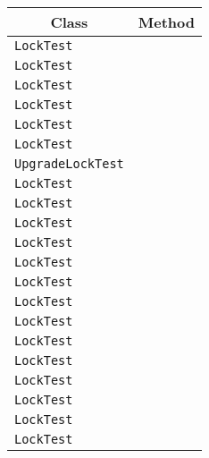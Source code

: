 \begin{center}
\begin{tabular}{ll}\toprule
\multicolumn{1}{c}{Class}&\multicolumn{1}{c}{Method}\\\midrule
\lstinline/LockTest/&\raisebox{0pt}{\lstinline/ testContendedPessimisticWriteLockNoWait()/}\\ 
\lstinline/LockTest/&\raisebox{0pt}{\lstinline/ testContendedPessimisticWriteLockTimeout()/}\\ 
\lstinline/LockTest/&\raisebox{0pt}{\lstinline/ testQueryTimeoutEMProps()/}\\ 
\lstinline/LockTest/&\raisebox{0pt}{\lstinline/ testQueryTimeout()/}\\ 
\lstinline/LockTest/&\raisebox{0pt}{\lstinline/ testContendedPessimisticReadLockTimeout()/}\\ 
\lstinline/LockTest/&\raisebox{0pt}{\lstinline/ testLockTimeoutEMProps()/}\\ 
\lstinline/UpgradeLockTest/&\raisebox{0pt}{\lstinline/ UpgradeReadLockToOptimisticForceIncrement()/}\\ 
\lstinline/LockTest/&\raisebox{0pt}{\lstinline/ call()/}\\ 
\lstinline/LockTest/&\raisebox{0pt}{\lstinline/ call()/}\\ 
\lstinline/LockTest/&\raisebox{0pt}{\lstinline/ call()/}\\ 
\lstinline/LockTest/&\raisebox{0pt}{\lstinline/ call()/}\\ 
\lstinline/LockTest/&\raisebox{0pt}{\lstinline/ call()/}\\ 
\lstinline/LockTest/&\raisebox{0pt}{\lstinline/ call()/}\\ 
\lstinline/LockTest/&\raisebox{0pt}{\lstinline/ call()/}\\ 
\lstinline/LockTest/&\raisebox{0pt}{\lstinline/ call()/}\\ 
\lstinline/LockTest/&\raisebox{0pt}{\lstinline/ call()/}\\ 
\lstinline/LockTest/&\raisebox{0pt}{\lstinline/ call()/}\\ 
\lstinline/LockTest/&\raisebox{0pt}{\lstinline/ call()/}\\ 
\lstinline/LockTest/&\raisebox{0pt}{\lstinline/ call()/}\\ 
\lstinline/LockTest/&\raisebox{0pt}{\lstinline/ call()/}\\ 
\lstinline/LockTest/&\raisebox{0pt}{\lstinline/ call()/}\\ 

\bottomrule
\end{tabular}
\end{center}

